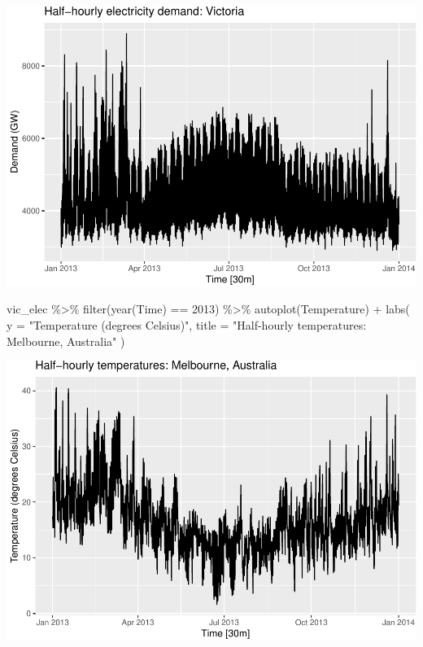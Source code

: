 \documentclass[
]{book}
\newenvironment{Shaded}{\begin{snugshade}}{\end{snugshade}}
\newcommand{\AttributeTok}[1]{\textcolor[rgb]{0.77,0.63,0.00}{#1}}
\newcommand{\DecValTok}[1]{\textcolor[rgb]{0.00,0.00,0.81}{#1}}
\newcommand{\FunctionTok}[1]{\textcolor[rgb]{0.00,0.00,0.00}{#1}}
\newcommand{\NormalTok}[1]{#1}
\newcommand{\SpecialCharTok}[1]{\textcolor[rgb]{0.00,0.00,0.00}{#1}}
\newcommand{\StringTok}[1]{\textcolor[rgb]{0.31,0.60,0.02}{#1}}
\begin{document}
\includegraphics{graphics/unnamed-chunk-18-1.pdf}

\begin{Shaded}
\begin{Highlighting}[]
\NormalTok{vic\_elec }\SpecialCharTok{\%\textgreater{}\%}
  \FunctionTok{filter}\NormalTok{(}\FunctionTok{year}\NormalTok{(Time) }\SpecialCharTok{==} \DecValTok{2013}\NormalTok{) }\SpecialCharTok{\%\textgreater{}\%}
  \FunctionTok{autoplot}\NormalTok{(Temperature) }\SpecialCharTok{+}
  \FunctionTok{labs}\NormalTok{(}
    \AttributeTok{y =} \StringTok{"Temperature (degrees Celsius)"}\NormalTok{,}
    \AttributeTok{title =} \StringTok{"Half{-}hourly temperatures: Melbourne, Australia"}
\NormalTok{  )}
\end{Highlighting}
\end{Shaded}

\includegraphics{graphics/unnamed-chunk-19-1.pdf}
\end{document}

